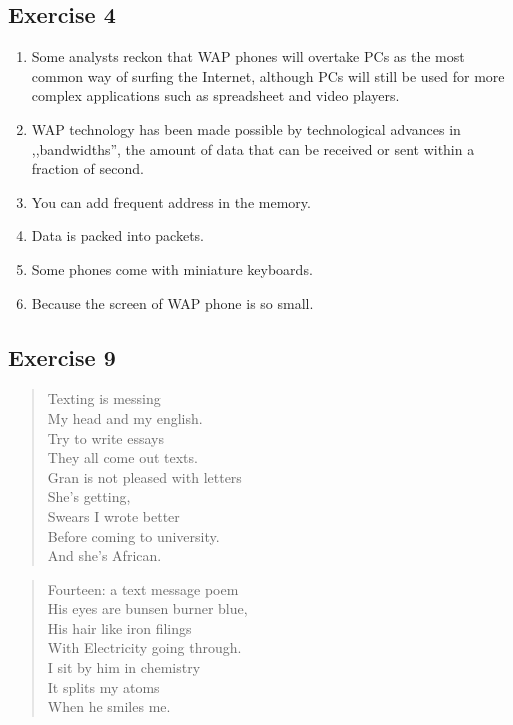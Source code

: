 \documentclass[a5paper,10pt,notitlepage,pdftex,headsepline]{scrartcl}
\begin{document}
  \subsection{Exercise 4}
    \begin{enumerate}
      \item Some analysts reckon that WAP phones will overtake PCs as the most
        common way of surfing the Internet, although PCs will still be used for
        more complex applications such as spreadsheet and video players.
      \item WAP technology has been made possible by technological advances in
        ,,bandwidths'', the amount of data that can be received or sent within a
        fraction of second.
      \item You can add frequent address in the memory.
      \item Data is packed into packets.
      \item Some phones come with miniature keyboards.
      \item Because the screen of WAP phone is so small.
    \end{enumerate}
  \subsection{Exercise 9}
      \begin{verse}
        Texting is messing\\
        My head and my english.\\
        Try to write essays\\
        They all come out texts.\\
        Gran is not pleased with letters\\
        She's getting,\\
        Swears I wrote better\\
        Before coming to university.\\
        And she's African.
      \end{verse}
      \begin{verse}
        Fourteen: a text message poem\\
        His eyes are bunsen burner blue,\\
        His hair like iron filings\\
        With Electricity going through.\\
        I sit by him in chemistry\\
        It splits my atoms\\
        When he smiles me.
      \end{verse}
\end{document}
